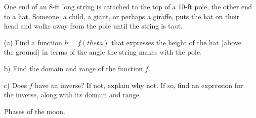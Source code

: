 \documentclass{ximera}
\begin{document}
\begin{question}  \label{Qtgb677432}
One end of an 8-ft long string is attached to the top of a 10-ft pole, the other end to a hat. Someone, a child, a giant, or perhaps a giraffe, puts the hat on their head and walks away from the pole until the string is taut.

(a) Find a function $h=f(theta)$ that expresses the height of the hat (above the ground) in terms of the angle the string makes with the pole.

b) Find the domain and range of the function $f$.

c) Does $f$ have an inverse? If not, explain why not. If so, find an expression for the inverse, along with its domain and range.
\end{question}




\begin{question} \label{Q8:RightTriangle}
Phases of the moon.

\begin{exploration}

 
\begin{onlineOnly}
    \begin{center}
\end{center}
\end{onlineOnly}
\end{exploration}

\end{question}
\end{document}

